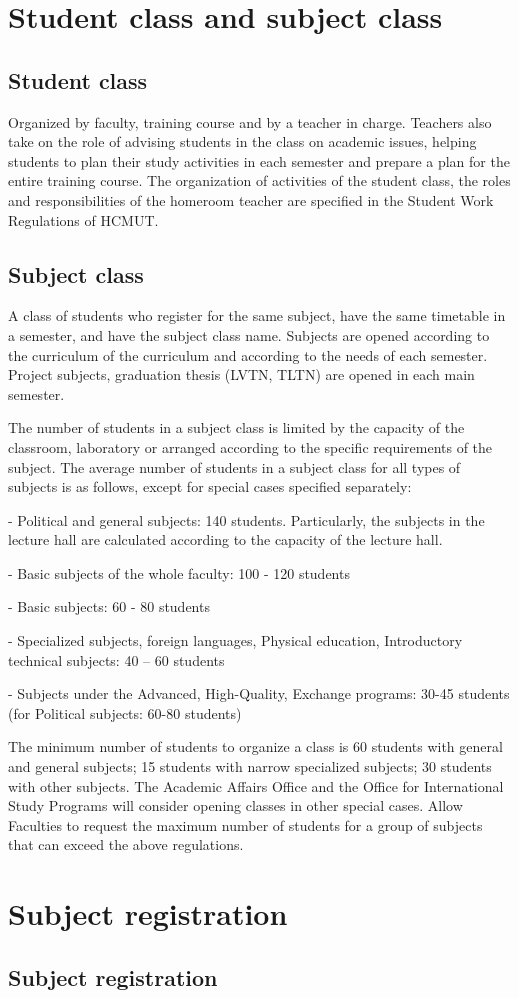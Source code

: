 \section{Student class and subject class}
\subsection{Student class}
Organized by faculty, training course and by a teacher in charge. Teachers also take on the role of advising students in the class on academic issues, helping students to plan their study activities in each semester and prepare a plan for the entire training course. The organization of activities of the student class, the roles and responsibilities of the homeroom teacher are specified in the Student Work Regulations of HCMUT.

\subsection{Subject class}
A class of students who register for the same subject, have the same timetable in a semester, and have the subject class name. Subjects are opened according to the curriculum of the curriculum and according to the needs of each semester. Project subjects, graduation thesis (LVTN, TLTN) are opened in each main semester.

The number of students in a subject class is limited by the capacity of the classroom, laboratory or arranged according to the specific requirements of the subject. The average number of students in a subject class for all types of subjects is as follows, except for special cases specified separately:

- Political and general subjects: 140 students. Particularly, the subjects in the lecture hall are calculated according to the capacity of the lecture hall.

- Basic subjects of the whole faculty: 100 - 120 students

- Basic subjects: 60 - 80 students

- Specialized subjects, foreign languages, Physical education, Introductory technical subjects: 40 – 60 students

- Subjects under the Advanced, High-Quality, Exchange programs: 30-45 students (for Political subjects: 60-80 students)

The minimum number of students to organize a class is 60 students with general and general subjects; 15 students with narrow specialized subjects; 30 students with other subjects. The Academic Affairs Office and the Office for International Study Programs will consider opening classes in other special cases. Allow Faculties to request the maximum number of students for a group of subjects that can exceed the above regulations.

\section{Subject registration}
\subsection{Subject registration}
